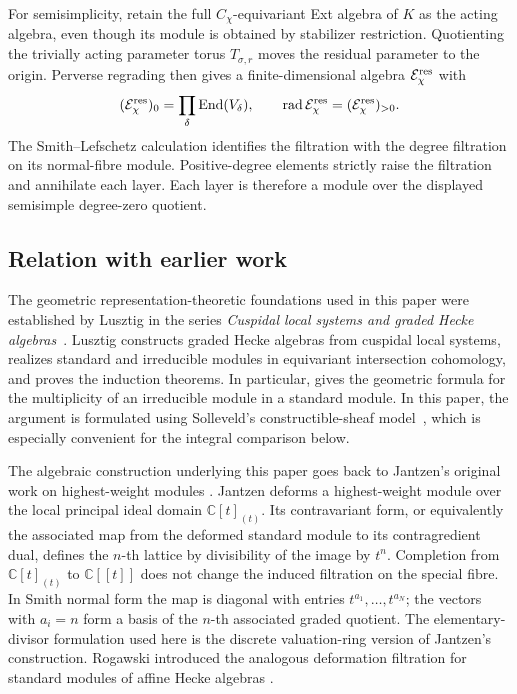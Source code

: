 \documentclass[11pt]{amsart}
\theoremstyle{definition}
\theoremstyle{remark}
\begin{document}
For semisimplicity, retain the full $C_\chi$-equivariant Ext algebra of
$K$ as the acting algebra, even though its module is obtained by
stabilizer restriction.  Quotienting the trivially acting parameter
torus $T_{\sigma,r}$ moves the residual parameter to the origin.
Perverse regrading then gives a finite-dimensional algebra
$\mathcal E_\chi^{\rm res}$ with
\[
 (\mathcal E_\chi^{\rm res})_0
   =\prod_\delta\operatorname{End}(V_\delta),\qquad
 \operatorname{rad}\mathcal E_\chi^{\rm res}
   =(\mathcal E_\chi^{\rm res})_{>0}.
\]
The Smith--Lefschetz calculation identifies the filtration with the
degree filtration on its normal-fibre module.  Positive-degree
elements strictly raise the filtration and annihilate each layer.
Each layer is therefore a module over the displayed semisimple
degree-zero quotient.

\subsection*{Relation with earlier work}

The geometric representation-theoretic foundations used in this paper were
established by Lusztig in the series \emph{Cuspidal local systems and graded
Hecke algebras}~\cite{LusztigCuspidalI,LusztigCuspidalII,LusztigCuspidalIII}.
Lusztig constructs graded Hecke algebras from cuspidal
local systems, realizes standard and irreducible modules in equivariant
intersection cohomology, and proves the induction theorems.  In particular,
\cite[Proposition~10.5 and Corollary~10.7]{LusztigCuspidalII} gives the
geometric formula for the multiplicity of an irreducible module in a standard
module.  In this paper, the argument is formulated using Solleveld's constructible-sheaf
model~\cite{Solleveld}, which is especially
convenient for the integral comparison below.  %

The algebraic construction underlying this paper goes back to
Jantzen's original work on highest-weight modules
\cite{JantzenForms,Jantzen}.  Jantzen deforms a highest-weight module over
the local principal ideal domain $\mathbb C[t]_{(t)}$.  Its contravariant
form, or equivalently the associated map from the deformed standard module
to its contragredient dual, defines the $n$-th lattice by divisibility of the
image by $t^n$.  Completion from $\mathbb C[t]_{(t)}$ to $\mathbb C[[t]]$
does not change the induced filtration on the special fibre.  In Smith
normal form the map is diagonal with entries $t^{a_1},\ldots,t^{a_N}$;
the vectors with $a_i=n$ form a basis of the $n$-th associated graded
quotient.  The elementary-divisor formulation used here is the discrete
valuation-ring version of Jantzen's construction. %
Rogawski introduced the analogous
deformation filtration for standard modules of affine Hecke algebras
\cite{Rogawski}.
\end{document}
